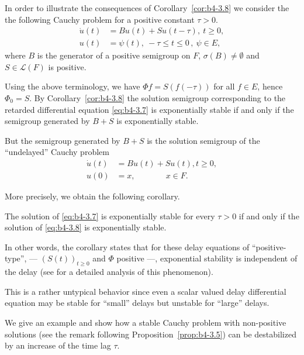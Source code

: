 \begin{example}\label{ex:b4-3.10}
	In order to illustrate the consequences of Corollary~\ref{cor:b4-3.8} we consider the the following Cauchy problem for a positive constant  $\tau > 0$.
	\begin{equation}\label{eq:b4-3.7}
		\begin{aligned}
		\dot{u}(t) &= Bu(t) + Su(t-\tau) , \  t \geq 0 ,\\
		u(t) &= \psi(t) , \  -\tau \leq t \leq 0 \,, \ \psi \in E ,
		\end{aligned}
	\end{equation}
	where $B$ is the generator of a positive semigroup on $F$, $\sigma(B) \neq \emptyset$ and $S \in \mathcal{L}(F)$ is positive.
	
	Using the above terminology, we have $\Phi f = S(f(-\tau))$ for all $f \in E$, hence $\Phi_{0} = S$. 
	By Corollary~\ref{cor:b4-3.8} the solution semigroup corresponding to the retarded differential equation \eqref{eq:b4-3.7} is exponentially stable if and only if the semigroup generated by $B + S$ is exponentially stable.
	
	But the semigroup generated by $B + S$ is the solution semigroup of the \enquote{undelayed} Cauchy problem
	\begin{equation}\label{eq:b4-3.8}
	\begin{aligned}
		\dot{u}(t) &= Bu(t) + Su(t) , t \geq 0 ,\\
		u(0) &= x , \quad\quad\quad\;\;\, x \in F.
	\end{aligned}
	\end{equation}
\end{example}
More precisely, we obtain the following corollary.
\begin{corollary*}
    The solution of \eqref{eq:b4-3.7} is exponentially stable for every $\tau > 0$ if and only if the solution of \eqref{eq:b4-3.8} is exponentially stable.
\end{corollary*}
In other words, the corollary states that for these delay equations of \enquote{positive-type}, 
--- $(S(t))_{t\geq0}$ and $\Phi$ positive ---, 
exponential stability is independent of the delay (see \citet{kerscher:1986} for a detailed analysis of this phenomenon).
	
This is a rather untypical behavior since even a scalar valued delay differential equation may be stable for \enquote{small} delays but unstable for \enquote{large} delays.
	
We give an example and show how a stable Cauchy problem with non-positive solutions (see the remark following Proposition~\ref{prop:b4-3.5}) can be destabilized by an increase of the time lag $\tau$.
	
